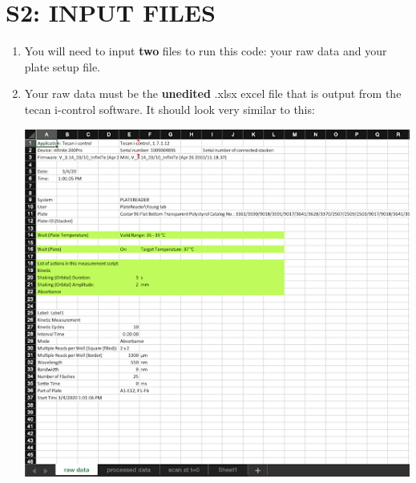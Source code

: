 \documentclass[12pt]{article}
\begin{document}
\section*{S2: INPUT FILES}
\label{sec:org3233746}
\begin{enumerate}
\item You will need to input \textbf{two} files to run this code: your raw data
and your plate setup file.

\item Your raw data must be the \textbf{unedited} .xlsx excel file that is output
from the tecan i-control software. It should look very similar to
this:

\begin{center}
\includegraphics[width=.9\linewidth]{./process_plate_reader_data_image01.png}
\end{center}
\begin{center}

\end{center}
\end{enumerate}
\end{document}
